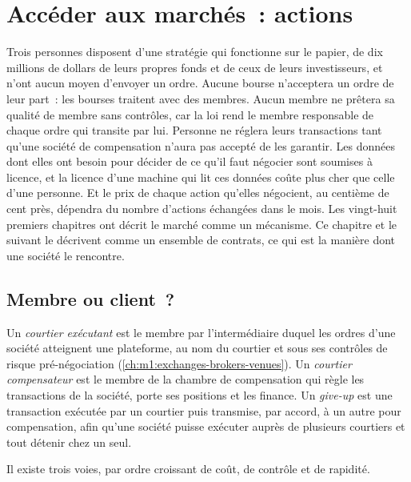 \chapter{Accéder aux marchés~: actions}\label{ch:m1:getting-access-equities}

Trois personnes disposent d'une stratégie qui fonctionne sur le papier, de dix millions de dollars
de leurs propres fonds et de ceux de leurs investisseurs, et n'ont aucun moyen d'envoyer un ordre.
Aucune bourse n'acceptera un ordre de leur part~: les bourses traitent avec des membres.
Aucun membre ne prêtera sa qualité de membre sans contrôles, car la loi rend le membre
responsable de chaque ordre qui transite par lui. Personne ne réglera leurs transactions
tant qu'une société de compensation n'aura pas accepté de les garantir.
Les données dont elles ont besoin pour décider de ce qu'il faut négocier sont soumises à licence,
et la licence d'une machine qui lit ces données coûte plus cher que celle d'une personne.
Et le prix de chaque action qu'elles négocient, au centième de cent près, dépendra
du nombre d'actions échangées dans le mois. Les vingt-huit premiers chapitres ont décrit le marché
comme un mécanisme. Ce chapitre et le suivant le décrivent comme un ensemble de contrats,
ce qui est la manière dont une société le rencontre.

\section{Membre ou client~?}

\begin{definition}\label{def:m1:getting-access-equities:brokers}
Un \emph{courtier exécutant} est le membre par l'intermédiaire duquel
les ordres d'une société atteignent une plateforme, au nom du courtier et sous
ses contrôles de risque pré-négociation (\cref{ch:m1:exchanges-brokers-venues}). Un \emph{courtier
compensateur} est le membre de la chambre de compensation qui règle
les transactions de la société, porte ses positions et les finance. Un
\emph{give-up} est une transaction exécutée par un courtier puis
transmise, par accord, à un autre pour compensation, afin qu'une société puisse
exécuter auprès de plusieurs courtiers et tout détenir chez un seul.
\end{definition}

Il existe trois voies, par ordre croissant de coût, de contrôle et de rapidité.

